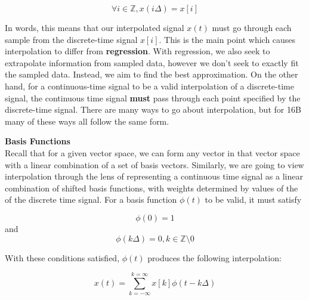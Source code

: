 \begin{equation*}
\forall i \in \mathbb{Z}, x(i \Delta) = x[i]
\end{equation*}

In words, this means that our interpolated signal $x(t)$ must go through each sample from the discrete-time signal $x[i]$.
This is the main point which causes interpolation to differ from \textbf{regression}.
With regression, we also seek to extrapolate information from sampled data, however we don't seek to exactly fit the sampled data.
Instead, we aim to find the best approximation.
On the other hand, for a continuous-time signal to be a valid interpolation of a discrete-time signal, the continuous time signal \textbf{must} pass through each point specified by the discrete-time signal.
\newline
There are many ways to go about interpolation, but for 16B many of these ways all follow the same form.

\textbf{Basis Functions} \\
Recall that for a given vector space, we can form any vector in that vector space with a linear combination of a set of basis vectors.
Similarly, we are going to view interpolation through the lens of representing a continuous time signal as a linear combination of shifted basis functions, with weights determined by values of the of the discrete time signal.
\newline
For a basis function $\phi(t)$ to be valid, it must satisfy

\begin{equation*}
    \phi(0) = 1
\end{equation*}
and
\begin{equation*}
    \phi(k \Delta) = 0, k \in \mathbb{Z} \setminus 0
\end{equation*}

With these conditions satisfied, $\phi(t)$ produces the following interpolation: 

\begin{equation*}
    x(t) = \sum_{k=-\infty}^{k=\infty} x[k] \phi(t - k \Delta)
\end{equation*}

